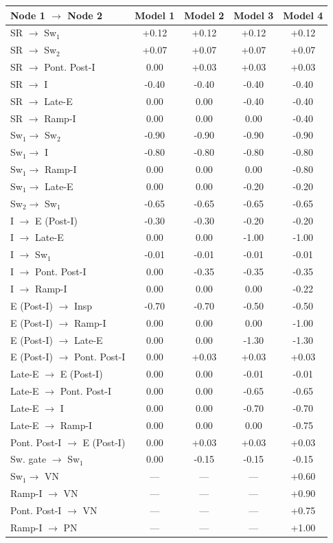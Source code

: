 \documentclass[pdflatex,sn-mathphys-ay]{sn-jnl}%
\theoremstyle{thmstyleone}%
\theoremstyle{thmstyletwo}%
\theoremstyle{thmstylethree}%
\begin{document}
\begin{center}
\begin{tabular}{l|c|c|c|c}
\hline
Node 1 $\to$ Node 2 & Model 1 & Model 2 & Model 3 & Model 4 \\ \hline
SR $\to$ Sw$_1$ & +0.12 & +0.12 & +0.12 & +0.12\\ 
SR $\to$ Sw$_2$ & +0.07 & +0.07 & +0.07 & +0.07\\ 
SR $\to$ Pont. Post-I & 0.00 & +0.03 & +0.03 & +0.03\\ 
SR $\to$ I & -0.40 & -0.40 & -0.40 & -0.40\\ 
SR $\to$ Late-E & 0.00 & 0.00 & -0.40 & -0.40\\ 
SR $\to$ Ramp-I & 0.00 & 0.00 & 0.00 & -0.40\\ 
Sw$_1 \to$ Sw$_2$ & -0.90 & -0.90 & -0.90 & -0.90\\ 
Sw$_1 \to$ I & -0.80 & -0.80 & -0.80 & -0.80\\
Sw$_1 \to$ Ramp-I & 0.00 & 0.00 & 0.00 & -0.80\\
Sw$_1 \to$ Late-E & 0.00 & 0.00 & -0.20 & -0.20\\
Sw$_2 \to$ Sw$_1$ & -0.65 & -0.65 & -0.65 & -0.65\\
I $\to$ E (Post-I) & -0.30 & -0.30 & -0.20 & -0.20\\
I $\to$ Late-E & 0.00 & 0.00 & -1.00 & -1.00\\
I $\to$ Sw$_1$ & -0.01 & -0.01 & -0.01 & -0.01\\
I $\to$ Pont. Post-I & 0.00 & -0.35 & -0.35 & -0.35\\
I $\to$ Ramp-I & 0.00 & 0.00 & 0.00 & -0.22\\
E (Post-I) $\to$ Insp & -0.70 & -0.70 & -0.50 & -0.50\\
E (Post-I) $\to$ Ramp-I & 0.00 & 0.00 & 0.00 & -1.00\\
E (Post-I) $\to$ Late-E & 0.00 & 0.00 & -1.30 & -1.30\\
E (Post-I) $\to$ Pont. Post-I & 0.00 & +0.03 & +0.03 & +0.03\\
Late-E $\to$ E (Post-I) & 0.00 & 0.00 & -0.01 & -0.01\\
Late-E $\to$ Pont. Post-I & 0.00 & 0.00 & -0.65 & -0.65\\
Late-E $\to$ I & 0.00 & 0.00 & -0.70 & -0.70\\
Late-E $\to$ Ramp-I & 0.00 & 0.00 & 0.00 & -0.75\\
Pont. Post-I $\to$ E (Post-I) & 0.00 & +0.03 & +0.03 & +0.03\\
Sw. gate $\to$ Sw$_1$ & 0.00 & -0.15 & -0.15 & -0.15\\
Sw$_1 \to$ VN & --- & --- & --- & +0.60\\
Ramp-I $\to$ VN & --- & --- & --- & +0.90\\
Pont. Post-I $\to$ VN & --- & --- & --- & +0.75\\
Ramp-I $\to$ PN & --- & --- & --- & +1.00\\ \hline
\end{tabular}
\label{tbl: connectivity_params}
\end{center}
\end{document}
